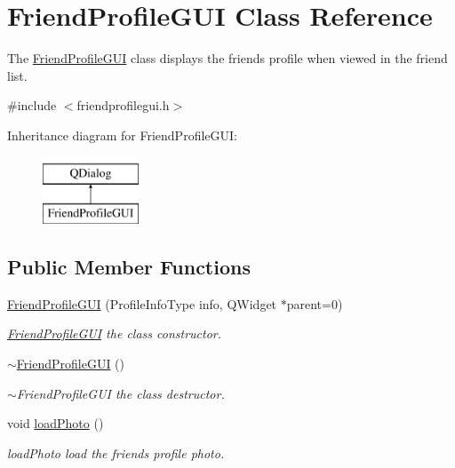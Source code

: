 \hypertarget{classFriendProfileGUI}{}\section{Friend\+Profile\+G\+UI Class Reference}
\label{classFriendProfileGUI}


The \hyperlink{classFriendProfileGUI}{Friend\+Profile\+G\+UI} class displays the friend\textquotesingle{}s profile when viewed in the friend list.  




{\ttfamily \#include $<$friendprofilegui.\+h$>$}

Inheritance diagram for Friend\+Profile\+G\+UI\+:\begin{figure}[H]
\begin{center}
\leavevmode
\includegraphics[height=2.000000cm]{classFriendProfileGUI}
\end{center}
\end{figure}
\subsection*{Public Member Functions}
\begin{DoxyCompactItemize}
\item 
\hyperlink{classFriendProfileGUI_aa7f13b61088872642f5045bd4e6b4bde}{Friend\+Profile\+G\+UI} (Profile\+Info\+Type info, Q\+Widget $\ast$parent=0)
\begin{DoxyCompactList}\small\item\em \hyperlink{classFriendProfileGUI}{Friend\+Profile\+G\+UI} the class constructor. \end{DoxyCompactList}\item 
\hyperlink{classFriendProfileGUI_abd8613b2bb6be67ac2ea1a77e1ad5a0f}{$\sim$\+Friend\+Profile\+G\+UI} ()
\begin{DoxyCompactList}\small\item\em $\sim$\+Friend\+Profile\+G\+UI the class destructor. \end{DoxyCompactList}\item 
void \hyperlink{classFriendProfileGUI_a27b6baf623b8965f9c9b6d407539b518}{load\+Photo} ()\hypertarget{classFriendProfileGUI_a27b6baf623b8965f9c9b6d407539b518}{}\label{classFriendProfileGUI_a27b6baf623b8965f9c9b6d407539b518}

\begin{DoxyCompactList}\small\item\em load\+Photo load the friend\textquotesingle{}s profile photo. \end{DoxyCompactList}\end{DoxyCompactItemize}


